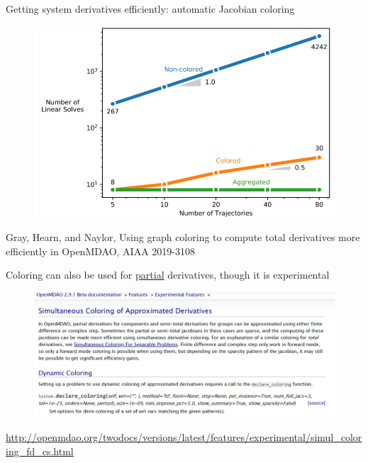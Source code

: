 \documentclass[aspectratio=169, usenames, dvipsnames, 14pt]{beamer}
\begin{document}
\begin{frame}{Getting system derivatives efficiently: automatic Jacobian coloring}

	\begin{figure}
		\includegraphics[scale=.36]{images/slide_57_derivatives.png}
	\end{figure}
	Gray, Hearn, and Naylor, Using graph coloring to compute total derivatives more efficiently in OpenMDAO, AIAA 2019-3108
	
\end{frame}

\begin{frame}{Coloring can also be used for \underline{partial} derivatives, though it is experimental}

	\begin{figure}
		\includegraphics[scale=.41]{images/slide_58_derivatives}
	\end{figure}
	\url{http://openmdao.org/twodocs/versions/latest/features/experimental/simul_coloring_fd_cs.html}

\end{frame}
\end{document}
